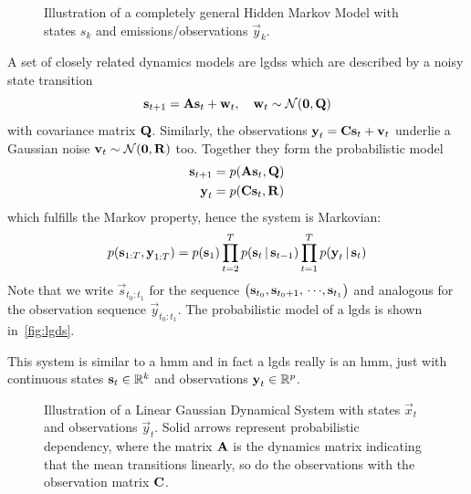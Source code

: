 	\begin{figure}
		\centering
		\tikzHiddenMarkovModel
		\caption[Illustration of a hidden Markov model]{Illustration of a completely general Hidden Markov Model with states \(s_k\) and emis\-sions/observations \(\vec{y}_k\).}
		\label{fig:hiddenMarkovModel}
	\end{figure}

	A set of closely related dynamics models are \acp{lgds} which are described by a noisy state transition
	\begin{equation*}
		\boldsymbol{\mathrm{s}}_{t + 1} = \boldsymbol{\mathrm{A}} \boldsymbol{\mathrm{s}}_t + \boldsymbol{\mathrm{w}}_t,\quad \boldsymbol{\mathrm{w}}_t \sim \mathcal{N}(\boldsymbol{\mathrm{0}}, \boldsymbol{\mathrm{Q}})
	\end{equation*}
	with covariance matrix \(\boldsymbol{\mathrm{Q}}\). Similarly, the observations \( \boldsymbol{\mathrm{y}}_t = \boldsymbol{\mathrm{C}} \boldsymbol{\mathrm{s}}_t + \boldsymbol{\mathrm{v}}_t \) underlie a Gaussian noise \( \boldsymbol{\mathrm{v}}_t \sim \mathcal{N}(\boldsymbol{\mathrm{0}}, \boldsymbol{\mathrm{R}}) \) too. Together they form the probabilistic model
	\begin{align*}
		\boldsymbol{\mathrm{s}}_{t + 1} &= p(\boldsymbol{\mathrm{A}} \boldsymbol{\mathrm{s}}_t, \boldsymbol{\mathrm{Q}}) \\
		\boldsymbol{\mathrm{y}}_t &= p(\boldsymbol{\mathrm{C}} \boldsymbol{\mathrm{s}}_t, \boldsymbol{\mathrm{R}})
	\end{align*}
	which fulfills the Markov property, hence the system is Markovian:
	\begin{equation*}
		p(\boldsymbol{\mathrm{s}}_{1:T}, \boldsymbol{\mathrm{y}}_{1:T}) = p(\boldsymbol{\mathrm{s}}_1) \prod_{t = 2}^{T} p(\boldsymbol{\mathrm{s}}_t \,\vert\, \boldsymbol{\mathrm{s}}_{t - 1}) \prod_{t = 1}^{T} p(\boldsymbol{\mathrm{y}}_t \,\vert\, \boldsymbol{\mathrm{s}}_t)
	\end{equation*}
	Note that we write \( \vec{s}_{t_0:t_1} \) for the sequence \( \big( \boldsymbol{\mathrm{s}}_{t_0}, \boldsymbol{\mathrm{s}}_{t_0 + 1}, \,\cdots\!, \boldsymbol{\mathrm{s}}_{t_1} \big) \) and analogous for the observation sequence \( \vec{y}_{t_0:t_1} \). The probabilistic model of a \ac{lgds} is shown in~\autoref{fig:lgds}.

	This system is similar to a \ac{hmm} and in fact a \ac{lgds} really is an \ac{hmm}, just with continuous states \( \boldsymbol{\mathrm{s}}_t \in \mathbb{R}^k \) and observations \( \boldsymbol{\mathrm{y}}_t \in \mathbb{R}^p \).

	\begin{figure}
		\centering
		\tikzLinearGaussianDynamicalSystem
		\caption[Illustration of a LGDS]{Illustration of a Linear Gaussian Dynamical System with states \(\vec{x}_t\) and observations \(\vec{y}_t\). Solid arrows represent probabilistic dependency, where the matrix \(\boldsymbol{\mathrm{A}}\) is the dynamics matrix indicating that the mean transitions linearly, so do the observations with the observation matrix \(\boldsymbol{\mathrm{C}}\).}
		\label{fig:lgds}
	\end{figure}

